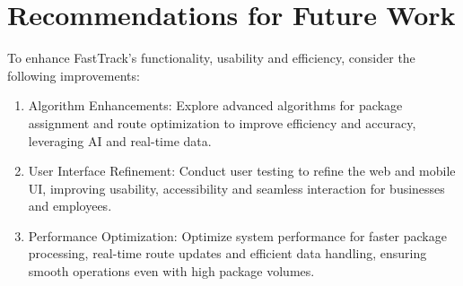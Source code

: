 \section{Recommendations for Future Work}
To enhance FastTrack's functionality, usability and efficiency, consider the following improvements:
\begin{enumerate}
    \item Algorithm Enhancements: Explore advanced algorithms for package assignment and route optimization to improve efficiency and accuracy, leveraging AI and real-time data.
    \item User Interface Refinement: Conduct user testing to refine the web and mobile UI, improving usability, accessibility and seamless interaction for businesses and employees.
    \item Performance Optimization: Optimize system performance for faster package processing, real-time route updates and efficient data handling, ensuring smooth operations even with high package volumes.
\end{enumerate}